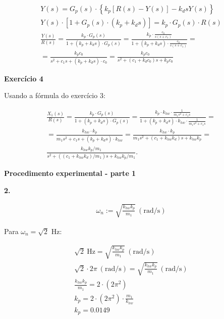 \documentclass[a4paper,11pt]{article}
\begin{document}
\begin{gather*}
    Y\left(s\right) = G_p\left(s\right) \cdot \left\{k_p \left[R\left(s\right) -
        Y\left(s\right)\right] - k_d s Y\left(s\right)\right\} \\
    Y\left(s\right) \cdot \left[1 + G_p\left(s\right) \cdot
        \left(k_p + k_d s\right)\right] =
        k_p \cdot G_p\left(s\right) \cdot R\left(s\right) \\
    \frac{Y\left(s\right)}{R\left(s\right)} = \frac{k_p \cdot G_p\left(s\right)}
        {1 + \left(k_p + k_d s\right) \cdot G_p\left(s\right)} =
        \frac{k_p \cdot \frac{c_0}{s\left(s + c_1\right)}}
        {1 + \left(k_p + k_d s\right) \cdot \frac{c_0}{s\left(s + c_1\right)}}
        = \\
    = \frac{k_p c_0}{s^2 + c_1 s + \left(k_p + k_d s\right) \cdot c_0} =
        \frac{k_p c_0}{s^2 + \left(c_1 + k_d c_0\right)s + k_p c_0}
\end{gather*}

\textbf{Exercício 4}

Usando a fórmula do exercício 3:

\begin{gather*}
    \frac{X_1\left(s\right)}{R\left(s\right)} = \frac{k_p \cdot
        G_p\left(s\right)}{1 + \left(k_p + k_d s\right) \cdot
        G_p\left(s\right)} =
        \frac{k_p \cdot k_{hw} \cdot \frac{1}{m_1 s^2 + c_1 s}}
        {1 + \left(k_p + k_d s\right) \cdot
        k_{hw} \cdot \frac{1}{m_1 s^2 + c_1 s}} = \\
    = \frac{k_{hw} \cdot k_p}
        {m_1 s^2 + c_1 s + \left(k_p + k_d s\right) \cdot k_{hw}} =
        \frac{k_{hw} \cdot k_p}
        {m_1 s^2 + \left(c_1 + k_{hw} k_d\right)s + k_{hw} k_p} = \\
        \frac{k_{hw} k_p / m_1}
        {s^2 + \left(\left(c_1 + k_{hw} k_d\right)/m_1\right)s +
        k_{hw} k_p / m_1} .
\end{gather*}

\pagebreak

\textbf{Procedimento experimental - parte 1}

\textbf{2.}

\begin{gather*}
    \omega_n := \sqrt{\frac{k_{hw}k_p}{m_1}} ~ \left(\text{rad/s}\right)
\end{gather*}

Para $\omega_n = \sqrt{2}$ Hz:

\begin{gather*}
    \sqrt{2}~\text{Hz} = \sqrt{\frac{k_{hw}k_p}{m_1}}
        ~ \left(\text{rad/s}\right) \\
    \sqrt{2} \cdot 2\pi ~ \left(\text{rad/s}\right) =
        \sqrt{\frac{k_{hw}k_p}{m_1}} ~ \left(\text{rad/s}\right) \\
    \frac{k_{hw}k_p}{m_1} = 2 \cdot \left(2\pi^2\right) \\
    k_p = 2 \cdot \left(2\pi^2\right) \cdot \frac{m_1}{k_{hw}} \\
    k_p = 0.0149
\end{gather*}
\end{document}
